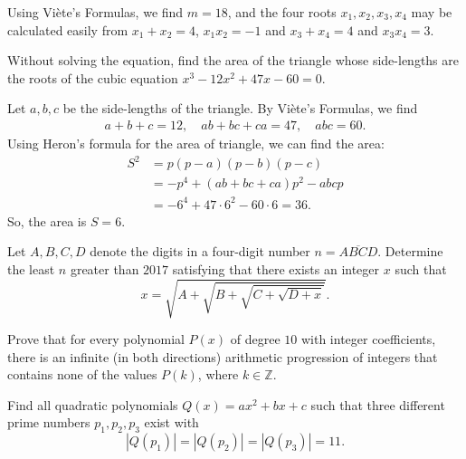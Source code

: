 \begin{solution}
    Using Viète's Formulas, we find $m=18$, and the four roots $x_1,x_2,x_3,x_4$ may be calculated easily from  $x_1+x_2=4$, $x_1x_2=-1$ and $x_3+x_4=4$ and $x_3x_4=3$.
\end{solution}

\begin{question}
    Without solving the equation, find the area of the triangle whose side-lengths are the roots of the cubic equation $x^3 - 12x^2 + 47x - 60 = 0$.
\end{question}

\begin{solution}
    Let $a,b,c$ be the side-lengths of the triangle. By Viète's Formulas, we find
    \begin{align*}
        a+b+c=12, \quad ab+bc+ca = 47, \quad abc = 60.
    \end{align*}
    Using Heron's formula for the area of triangle, we can find the area:
    \begin{align*}
        S^2 &= p(p-a)(p-b)(p-c) \\
        &= -p^4 + (ab+bc+ca)p^2 - abcp\\
        &= -6^4 + 47\cdot 6^2 - 60\cdot 6  = 36.
    \end{align*}
    So, the area is $S=6$.
\end{solution}


\begin{question}[name={2017 Denmark (Georg Mohr)}]
    Let $A,B,C,D$ denote the digits in a four-digit number $n=\overline{ABCD}$. Determine the least $n$ greater than $2017$ satisfying that there exists an integer $x$ such that \[x=\sqrt{A+\sqrt{B+\sqrt{C+\sqrt{D+x}}}}.\]
\end{question}


\begin{question}[name={1999 Switzerland TST}]
    Prove that for every polynomial $P(x)$ of degree $10$ with integer coefficients, there is an infinite (in both directions) arithmetic progression of integers that contains none of the values $P(k)$, where $k\in\mathbb Z$.
\end{question}


\begin{question}[name={2003 Switzerland TST}]
    Find all quadratic polynomials $Q(x)=ax^2+bx+c$ such that three different prime numbers $p_1, p_2, p_3$ exist with
    \[|Q(p_1)|=|Q(p_2)|=|Q(p_3)|=11.\]
\end{question}


